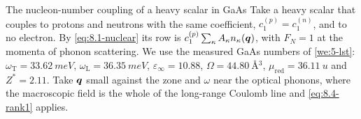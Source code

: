 \begin{workedexample}{The nucleon-number coupling of a heavy scalar in GaAs}\label{we:8-nucleon}
Take a heavy scalar that couples to protons and neutrons with the same coefficient, $c_1^{(p)} = c_1^{(n)}$, and to no electron. By \cref{eq:8.1-nuclear} its row is $c_1^{(p)}\sum_\kappa A_\kappa n_\kappa(\bm{q})$, with $F_N = 1$ at the momenta of phonon scattering. We use the measured GaAs numbers of \cref{we:5-lst}: $\omega_{\mathrm{T}} = \SI{33.62}{meV}$, $\omega_{\mathrm{L}} = \SI{36.35}{meV}$, $\varepsilon_\infty = 10.88$, $\Omega = \SI{44.80}{\angstrom^3}$, $\mu_{\mathrm{red}} = \SI{36.11}{u}$ and $Z^* = 2.11$. Take $\bm{q}$ small against the zone and $\omega$ near the optical phonons, where the macroscopic field is the whole of the long-range Coulomb line and \cref{eq:8.4-rank1} applies.


\end{workedexample}
